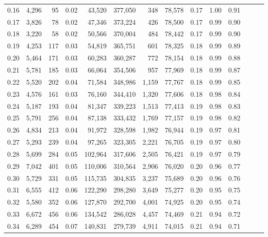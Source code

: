 \begin{tabular}{rrrrrrrrrrrrrr}
0.16 &  4,296 &     95 &  0.02 &   43,520 &  377,050 &     348 &  78,578 &  0.17 &  1.00 &      0.91 \\
0.17 &  3,826 &     78 &  0.02 &   47,346 &  373,224 &     426 &  78,500 &  0.17 &  0.99 &      0.90 \\
0.18 &  3,220 &     58 &  0.02 &   50,566 &  370,004 &     484 &  78,442 &  0.17 &  0.99 &      0.90 \\
0.19 &  4,253 &    117 &  0.03 &   54,819 &  365,751 &     601 &  78,325 &  0.18 &  0.99 &      0.89 \\
0.20 &  5,464 &    171 &  0.03 &   60,283 &  360,287 &     772 &  78,154 &  0.18 &  0.99 &      0.88 \\
0.21 &  5,781 &    185 &  0.03 &   66,064 &  354,506 &     957 &  77,969 &  0.18 &  0.99 &      0.87 \\
0.22 &  5,520 &    202 &  0.04 &   71,584 &  348,986 &   1,159 &  77,767 &  0.18 &  0.99 &      0.85 \\
0.23 &  4,576 &    161 &  0.03 &   76,160 &  344,410 &   1,320 &  77,606 &  0.18 &  0.98 &      0.84 \\
0.24 &  5,187 &    193 &  0.04 &   81,347 &  339,223 &   1,513 &  77,413 &  0.19 &  0.98 &      0.83 \\
0.25 &  5,791 &    256 &  0.04 &   87,138 &  333,432 &   1,769 &  77,157 &  0.19 &  0.98 &      0.82 \\
0.26 &  4,834 &    213 &  0.04 &   91,972 &  328,598 &   1,982 &  76,944 &  0.19 &  0.97 &      0.81 \\
0.27 &  5,293 &    239 &  0.04 &   97,265 &  323,305 &   2,221 &  76,705 &  0.19 &  0.97 &      0.80 \\
0.28 &  5,699 &    284 &  0.05 &  102,964 &  317,606 &   2,505 &  76,421 &  0.19 &  0.97 &      0.79 \\
0.29 &  7,042 &    401 &  0.05 &  110,006 &  310,564 &   2,906 &  76,020 &  0.20 &  0.96 &      0.77 \\
0.30 &  5,729 &    331 &  0.05 &  115,735 &  304,835 &   3,237 &  75,689 &  0.20 &  0.96 &      0.76 \\
0.31 &  6,555 &    412 &  0.06 &  122,290 &  298,280 &   3,649 &  75,277 &  0.20 &  0.95 &      0.75 \\
0.32 &  5,580 &    352 &  0.06 &  127,870 &  292,700 &   4,001 &  74,925 &  0.20 &  0.95 &      0.74 \\
0.33 &  6,672 &    456 &  0.06 &  134,542 &  286,028 &   4,457 &  74,469 &  0.21 &  0.94 &      0.72 \\
0.34 &  6,289 &    454 &  0.07 &  140,831 &  279,739 &   4,911 &  74,015 &  0.21 &  0.94 &      0.71 \\

\end{tabular}
